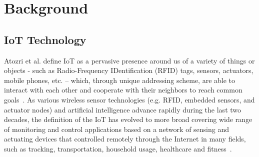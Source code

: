 \chapter{Background}\label{chapter:Relatedwork}

\section{IoT Technology}
Atozri et al. define IoT as a pervasive presence around us of a variety of things or objects - such as Radio-Frequency IDentification (RFID) tags, sensors, actuators, mobile phones, etc. -- which, through unique addressing scheme, are able to interact with each other and cooperate with their neighbors to reach common goals~\cite{atzori2010internet}. As various wireless sensor technologies (e.g. RFID, embedded sensors, and actuator nodes) and artificial intelligence advance rapidly during the last two decades, the definition of the IoT has evolved to more broad covering wide range of monitoring and control applications based on a network of sensing and actuating devices that controlled remotely through the Internet in many fields, such as tracking, transportation, household usage, healthcare and fitness~\cite{li2011smart, solima2016object, kelly2013towards, jia2012rfid, hassanalieragh2015health}.

